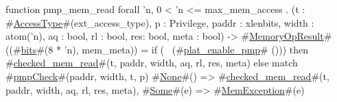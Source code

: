 function pmp_mem_read forall 'n, 0 < 'n <= max_mem_access . (t : #\hyperref[sailRISCVzAccessType]{AccessType}#(ext_access_type), p : Privilege, paddr : xlenbits, width : atom('n), aq : bool, rl : bool, res: bool, meta : bool) -> #\hyperref[sailRISCVzMemoryOpResult]{MemoryOpResult}#((#\hyperref[sailRISCVzbits]{bits}#(8 * 'n), mem_meta)) =
  if   (~ (#\hyperref[sailRISCVzplatzyenablezypmp]{plat\_enable\_pmp}# ()))
  then #\hyperref[sailRISCVzcheckedzymemzyread]{checked\_mem\_read}#(t, paddr, width, aq, rl, res, meta)
  else {
    match #\hyperref[sailRISCVzpmpCheck]{pmpCheck}#(paddr, width, t, p) {
      #\hyperref[sailRISCVzNone]{None}#()  => #\hyperref[sailRISCVzcheckedzymemzyread]{checked\_mem\_read}#(t, paddr, width, aq, rl, res, meta),
      #\hyperref[sailRISCVzSome]{Some}#(e) => #\hyperref[sailRISCVzMemException]{MemException}#(e)
    }
  }
